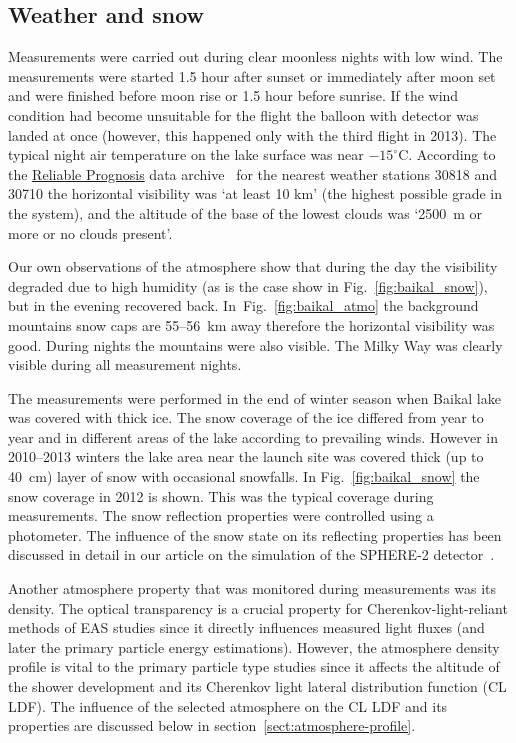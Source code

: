 \documentclass[final,5p,times,twocolumn]{elsarticle}
\begin{document}
\subsection{Weather and snow}

Measurements were carried out during clear moonless nights with low wind. The measurements were started 1.5 hour after sunset or immediately after moon set and were finished before moon rise or 1.5 hour before sunrise. If the wind condition had become unsuitable for the flight the balloon with detector was landed at once (however, this happened only with the third flight in 2013). The typical night air temperature on the lake surface was near $-15^\circ$C. According to the \href{https://rp5.ru/Weather_in_the_world}{Reliable Prognosis} data archive~\cite{rp5} for the nearest weather stations 30818 and 30710 the horizontal visibility was `at least 10 km' (the highest possible grade in the system), and the altitude of the base of the lowest clouds was `2500~m or more or no clouds present'.

Our own observations of the atmosphere show that during the day the visibility degraded due to high humidity (as is the case show in Fig.~\ref{fig:baikal_snow}), but in the evening recovered back. In~Fig.~\ref{fig:baikal_atmo} the background mountains snow caps are 55--56~km away therefore the horizontal visibility was good. During nights the mountains were also visible. The Milky Way was clearly visible during all measurement nights. 

The measurements were performed in the end of winter season when Baikal lake was covered with thick ice. The snow coverage of the ice differed from year to year and in different areas of the lake according to prevailing winds. However in 2010--2013 winters the lake area near the launch site was covered thick (up to 40~cm) layer of snow with occasional snowfalls. In Fig.~\ref{fig:baikal_snow} the snow coverage in 2012 is shown. This was the typical coverage during measurements. The snow reflection properties were controlled using a photometer. The influence of the snow state on its reflecting properties has been discussed in detail in our article on the simulation of the SPHERE-2 detector~\cite{Ant19}.

Another atmosphere property that was monitored during measurements was its density. The optical transparency is a crucial property for Cherenkov-light-reliant methods of EAS studies since it directly influences measured light fluxes (and later the primary particle energy estimations). However, the atmosphere density profile is vital to the primary particle type studies since it affects the altitude of the shower development and its Cherenkov light lateral distribution function (CL LDF). The influence of the selected atmosphere on the CL LDF and its properties are discussed below in section~\ref{sect:atmosphere-profile}.
\end{document}

